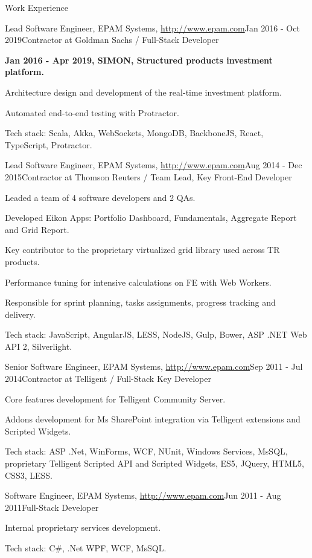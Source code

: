 \documentclass{resume}
\begin{document}
\begin{rSection}{Work Experience}
\begin{rSubsection}{Lead Software Engineer, EPAM Systems, \url{http://www.epam.com}}{Jan 2016 - Oct 2019}{Contractor at Goldman Sachs / Full-Stack Developer}{}
\item[] \textbf{Jan 2016 - Apr 2019, SIMON, Structured products investment platform.}
\item Architecture design and development of the real-time investment platform.
\item Automated end-to-end testing with Protractor.

Tech stack: Scala, Akka, WebSockets, MongoDB, BackboneJS, React, TypeScript, Protractor.
\end{rSubsection}


\begin{rSubsection}{Lead Software Engineer, EPAM Systems, \url{http://www.epam.com}}{Aug 2014 - Dec 2015}{Contractor at Thomson Reuters / Team Lead, Key Front-End Developer}{}
\item Leaded a team of 4 software developers and 2 QAs.
\item Developed Eikon Apps: Portfolio Dashboard, Fundamentals, Aggregate Report and Grid Report.
\item Key contributor to the proprietary virtualized grid library used across TR products.
\item Performance tuning for intensive calculations on FE with Web Workers.
\item Responsible for sprint planning, tasks assignments, progress tracking and delivery.

Tech stack: JavaScript, AngularJS, LESS, NodeJS, Gulp, Bower, ASP .NET Web API 2, Silverlight.
\end{rSubsection}

\begin{rSubsection}{Senior Software Engineer, EPAM Systems, \url{http://www.epam.com}}{Sep 2011 - Jul 2014}{Contractor at Telligent / Full-Stack Key Developer}{}
\item Core features development for Telligent Community Server.
\item Addons development for Ms SharePoint integration via Telligent extensions and Scripted Widgets.

Tech stack:  ASP .Net, WinForms, WCF, NUnit, Windows Services, MsSQL, proprietary Telligent Scripted API and Scripted Widgets, ES5, JQuery, HTML5, CSS3, LESS.
\end{rSubsection}


\begin{rSubsection}{Software Engineer, EPAM Systems, \url{http://www.epam.com}}{Jun 2011 - Aug 2011}{Full-Stack Developer}{}
\item Internal proprietary services development.

Tech stack: C\#, .Net WPF, WCF, MsSQL.
\end{rSubsection}

\end{rSection}
\end{document}
